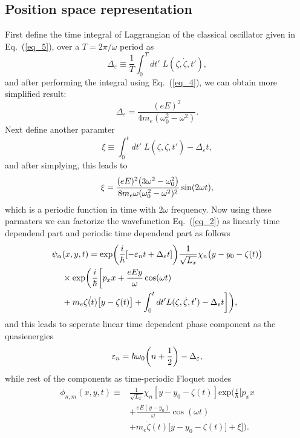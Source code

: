 \subsection{Position space representation}

First define the time integral of Laggrangian of the classical oscillator given in Eq.~(\ref{eq_5}), over a $T=2\pi/\omega$ period as
\begin{equation} \label{eq_b1}
  \Delta_{\varepsilon} \equiv \frac{1}{T} \int_0^T dt' \; L(\zeta,\dot{\zeta},t'),
\end{equation}
and after performing the integral using Eq.~(\ref{eq_4}), we can obtain more simplified result:
\begin{equation} \label{eq_b2}
  \Delta_{\varepsilon} = \frac{(eE)^2}{4m_e(\omega_0^2 - \omega^2)}.
\end{equation}
Next define another paramter
\begin{equation} \label{eq_b3}
  \xi \equiv
  \int_0^t dt' \; L(\zeta,\dot{\zeta},t') -
  \Delta_{\varepsilon} t,
\end{equation}
and after simplying, this leads to
\begin{equation} \label{eq_b4}
  \xi =
  \frac{(eE)^2\qty(3\omega^2 - \omega_0^2)}{8m_e\omega(\omega_0^2 - \omega^2)^2} \sin(2\omega t),
\end{equation}
which is a periodic function in time with $2\omega$ frequency. Now using these  parmaters we can factorize the wavefunction Eq.~(\ref{eq_2}) as linearly time dependend part and periodic time dependend part as follows
\begin{equation} \label{eq_b5}
  \begin{aligned}
    \psi_{\alpha}&(x,y,t)  =
    \exp(\frac{i}{\hbar}\qty[-\varepsilon_nt + \Delta_{\varepsilon} t ])
    \frac{1}{\sqrt{L_x}} \chi_n\big(y - y_0 - \zeta(t)\big)
    \\
    & \times
    \text{exp}\bigg(
     \frac{i}{\hbar}\bigg[
     p_x x +
     \frac{eEy}{\omega}\cos(\omega t) \\
     & +
     m_e\dot{\zeta(t)}\big[y-\zeta(t)\big]
     + \int_0^{t}dt'L(\zeta,\dot{\zeta},t') - \Delta_{\varepsilon} t  \bigg]
     \bigg),
  \end{aligned}
\end{equation}
and this leads to seperate linear time dependent phase component as the quasienergies
\begin{equation} \label{eq_b6}
  \varepsilon_{n} =
  \hbar \omega_0\qty(n + \frac{1}{2}) - \Delta_{\varepsilon},
\end{equation}
while rest of the components as time-periodic Floquet modes
\begin{equation} \label{eq_b7}
  \begin{aligned}
    \phi_{n,m}(x,y,t) \equiv &
    \frac{1}{\sqrt{L_x}} \chi_{n}\left[y - y_0 - \zeta(t)\right]
    \text{exp}\bigg(
     \frac{i}{\hbar}\bigg[
     p_x x \\
     & +
     \frac{eE(y - y_0)}{\omega}\cos(\omega t) \\
     & +
     m_e\dot{\zeta}(t)\big[y - y_0 -\zeta(t)\big]
     + \xi \bigg]\bigg).
  \end{aligned}
\end{equation}

